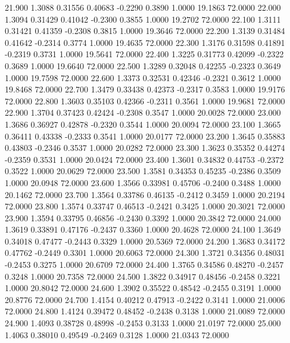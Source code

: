   21.900   1.3088   0.31556   0.40683  -0.2290   0.3890   1.0000  19.1863  72.0000
  22.000   1.3094   0.31429   0.41042  -0.2300   0.3855   1.0000  19.2702  72.0000
  22.100   1.3111   0.31421   0.41359  -0.2308   0.3815   1.0000  19.3646  72.0000
  22.200   1.3139   0.31484   0.41642  -0.2314   0.3774   1.0000  19.4635  72.0000
  22.300   1.3176   0.31598   0.41891  -0.2319   0.3731   1.0000  19.5641  72.0000
  22.400   1.3225   0.31773   0.42099  -0.2322   0.3689   1.0000  19.6640  72.0000
  22.500   1.3289   0.32048   0.42255  -0.2323   0.3649   1.0000  19.7598  72.0000
  22.600   1.3373   0.32531   0.42346  -0.2321   0.3612   1.0000  19.8468  72.0000
  22.700   1.3479   0.33438   0.42373  -0.2317   0.3583   1.0000  19.9176  72.0000
  22.800   1.3603   0.35103   0.42366  -0.2311   0.3561   1.0000  19.9681  72.0000
  22.900   1.3704   0.37423   0.42424  -0.2308   0.3547   1.0000  20.0028  72.0000
  23.000   1.3686   0.36927   0.42878  -0.2320   0.3544   1.0000  20.0094  72.0000
  23.100   1.3665   0.36411   0.43338  -0.2333   0.3541   1.0000  20.0177  72.0000
  23.200   1.3645   0.35883   0.43803  -0.2346   0.3537   1.0000  20.0282  72.0000
  23.300   1.3623   0.35352   0.44274  -0.2359   0.3531   1.0000  20.0424  72.0000
  23.400   1.3601   0.34832   0.44753  -0.2372   0.3522   1.0000  20.0629  72.0000
  23.500   1.3581   0.34353   0.45235  -0.2386   0.3509   1.0000  20.0948  72.0000
  23.600   1.3566   0.33981   0.45706  -0.2400   0.3488   1.0000  20.1462  72.0000
  23.700   1.3564   0.33786   0.46135  -0.2412   0.3459   1.0000  20.2194  72.0000
  23.800   1.3574   0.33747   0.46513  -0.2421   0.3425   1.0000  20.3021  72.0000
  23.900   1.3594   0.33795   0.46856  -0.2430   0.3392   1.0000  20.3842  72.0000
  24.000   1.3619   0.33891   0.47176  -0.2437   0.3360   1.0000  20.4628  72.0000
  24.100   1.3649   0.34018   0.47477  -0.2443   0.3329   1.0000  20.5369  72.0000
  24.200   1.3683   0.34172   0.47762  -0.2449   0.3301   1.0000  20.6063  72.0000
  24.300   1.3721   0.34356   0.48031  -0.2453   0.3275   1.0000  20.6709  72.0000
  24.400   1.3765   0.34586   0.48270  -0.2457   0.3248   1.0000  20.7358  72.0000
  24.500   1.3822   0.34917   0.48456  -0.2458   0.3221   1.0000  20.8042  72.0000
  24.600   1.3902   0.35522   0.48542  -0.2455   0.3191   1.0000  20.8776  72.0000
  24.700   1.4154   0.40212   0.47913  -0.2422   0.3141   1.0000  21.0006  72.0000
  24.800   1.4124   0.39472   0.48452  -0.2438   0.3138   1.0000  21.0089  72.0000
  24.900   1.4093   0.38728   0.48998  -0.2453   0.3133   1.0000  21.0197  72.0000
  25.000   1.4063   0.38010   0.49549  -0.2469   0.3128   1.0000  21.0343  72.0000
